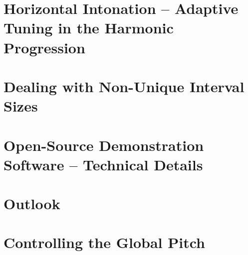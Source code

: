 \documentclass[a4paper,11pt]{iopart}
\begin{document}


\section{Horizontal Intonation -- Adaptive Tuning in the Harmonic Progression}



\section{Dealing with Non-Unique Interval Sizes}



\section{Open-Source Demonstration Software -- Technical Details}



\section{Outlook}



\appendix
\section{Controlling the Global Pitch}



\end{document}

